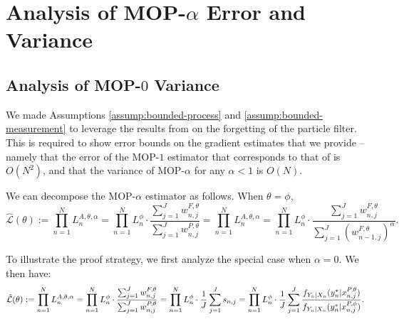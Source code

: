 \documentclass{article}
\begin{document}


\section{Analysis of MOP-$\alpha$ Error and Variance}

\subsection{Analysis of MOP-$0$ Variance}

We made Assumptions \ref{assump:bounded-process} and \ref{assump:bounded-measurement} to leverage the results from \cite{karjalainen2023} on the forgetting of the particle filter. This is required to show error bounds on the gradient estimates that we provide -- namely that the error of the MOP-$1$ estimator that corresponds to that of \cite{poyiadjis11} is $O(N^2)$, and that the variance of MOP-$\alpha$ for any $\alpha<1$ is $O(N)$. 

We can decompose the MOP-$\alpha$ estimator as follows. When $\theta=\phi$,
$$\hat{\mathcal{L}}(\theta):=\prod_{n=1}^N L_n^{A, \theta, \alpha}=\prod_{n=1}^N L_n^\phi \cdot \frac{\sum_{j=1}^J w_{n, j}^{F, \theta}}{\sum_{j=1}^J w_{n, j}^{P, \theta}}=\prod_{n=1}^N L_n^{A, \theta, \alpha}=\prod_{n=1}^N L_n^\phi \cdot \frac{\sum_{j=1}^J w_{n, j}^{F, \theta}}{\sum_{j=1}^J (w_{n-1, j}^{F, \theta})^\alpha}.$$

To illustrate the proof strategy, we first analyze the special case when $\alpha=0.$ We then have:
\begin{equation}
    \hat{\mathcal{L}}(\theta) := \prod_{n=1}^N L_n^{A, \theta, \alpha} = \prod_{n=1}^N L_n^\phi \cdot \frac{\sum_{j=1}^J w_{n,j}^{F,\theta}}{\sum_{j=1}^J w_{n,j}^{P,\theta}} = \prod_{n=1}^N L_n^\phi \cdot \frac{1}{J}\sum_{j=1}^J s_{n,j} = \prod_{n=1}^N L_n^\phi \cdot \frac{1}{J}\sum_{j=1}^J \frac{f_{Y_n|X_n}(y_n^*|x_{n,j}^{P, \theta})}{f_{Y_n|X_n}(y_n^*|x_{n,j}^{P, \phi})}.
\end{equation}
\end{document}

